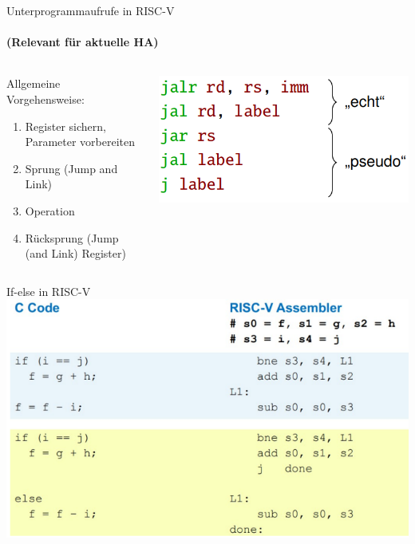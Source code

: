 \documentclass[
  german,            %
  aspectratio=169,    %
]{tumbeamer}
\begin{document}
\begin{frame}[c]{Unterprogrammaufrufe in RISC-V}
  \framesubtitle{(Relevant für aktuelle HA)}
  \begin{columns}[c]
    \begin{column}{0.5\textwidth}
      Allgemeine Vorgehensweise:\\[.2cm] 
      \begin{enumerate}
        \item Register sichern, Parameter vorbereiten
        \item Sprung (Jump and Link)
        \item Operation
        \item Rücksprung (Jump (and Link) Register)
      \end{enumerate}
    \end{column}
    \begin{column}{0.4\textwidth}
      \includegraphics[width=\linewidth]{w03_jumpInstructionsWithPseudo_zue.png}
    \end{column}
  \end{columns}
\end{frame}

\begin{frame}[c]{If-else in RISC-V}{}
  \centering
  \includegraphics[width=0.75\linewidth]{w03_ifelseassembly.png}
\end{frame}
\end{document}
